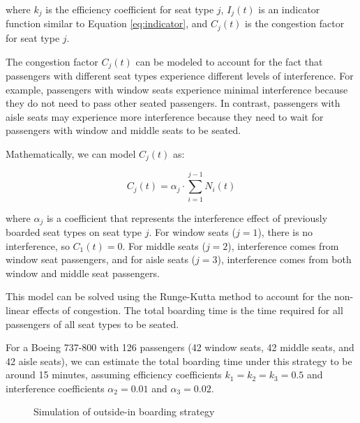 \documentclass[12pt,a4paper]{article}
\begin{document}
where $k_j$ is the efficiency coefficient for seat type $j$, $I_j(t)$ is an indicator function similar to Equation \ref{eq:indicator}, and $C_j(t)$ is the congestion factor for seat type $j$.

The congestion factor $C_j(t)$ can be modeled to account for the fact that passengers with different seat types experience different levels of interference. For example, passengers with window seats experience minimal interference because they do not need to pass other seated passengers. In contrast, passengers with aisle seats may experience more interference because they need to wait for passengers with window and middle seats to be seated.

Mathematically, we can model $C_j(t)$ as:

\begin{equation}
C_j(t) = \alpha_j \cdot \sum_{i=1}^{j-1} N_i(t)
\label{eq:seat_type_congestion}
\end{equation}

where $\alpha_j$ is a coefficient that represents the interference effect of previously boarded seat types on seat type $j$. For window seats ($j = 1$), there is no interference, so $C_1(t) = 0$. For middle seats ($j = 2$), interference comes from window seat passengers, and for aisle seats ($j = 3$), interference comes from both window and middle seat passengers.

This model can be solved using the Runge-Kutta method to account for the non-linear effects of congestion. The total boarding time is the time required for all passengers of all seat types to be seated.

For a Boeing 737-800 with 126 passengers (42 window seats, 42 middle seats, and 42 aisle seats), we can estimate the total boarding time under this strategy to be around 15 minutes, assuming efficiency coefficients $k_1 = k_2 = k_3 = 0.5$ and interference coefficients $\alpha_2 = 0.01$ and $\alpha_3 = 0.02$.

\begin{figure}[H]
\centering
{}
\caption{Simulation of outside-in boarding strategy}
\label{fig:outside_in}
\end{figure}
\end{document}
